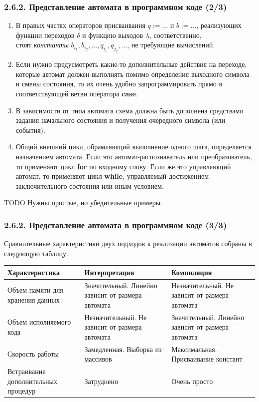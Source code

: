 \documentclass[mathserif,12pt,aspectratio=169]{beamer}
\def\emразделенной{\em разделенной}
\def\em#1{\it\color{blue}#1}
\def\Assign{\operatorname{:=}}
\def\TODO#1{{\color{gray} TODO {#1}}}
\begin{document}
\begin{frame}
\frametitle{2.6.2. Представление автомата в программном коде (2/3)}

\begin{remark} 
\begin{enumerate}
\item В правых частях операторов присваивания $q\Assign\dots$ и
$b\Assign\dots$, реализующих функции переходов $\delta$ и функцию
выходов $\lambda$, соответственно, \\стоят 
{\em константы} $b_{i_1},
b_{i_2},\dots, q_{i_1}, q_{j_2}, \dots$, не требующие вычислений.
\item Если нужно предусмотреть какие-то дополнительные действия
на переходе, которые автомат должен выполнять помимо определения
выходного символа и смены состояния, то их очень удобно
запрограммировать прямо в соответствующей ветви оператора
\textbf{case}.
\item В зависимости от типа автомата схема 
должна быть дополнена средствами задания начального состояния и получения очередного символа (или события).
\item Общий внешний цикл, обрамляющий выполнение одного шага, определяется назначением автомата.
Если это автомат-распознаватель или преобразователь,
то применяют цикл \textbf{for} по входному слову.
Если же это управляющий автомат, то применяют цикл
\textbf{while}, управляемый достижением заключительного состояния или иным условием. 
\end{enumerate}
\end{remark}

\TODO{Нужны простые, но убедительные примеры.}
\end{frame}


\begin{frame}
\frametitle{2.6.2. Представление автомата в программном коде (3/3)}

Сравнительные характеристики двух подходов к реализации автоматов
собраны в следующую таблицу.

\begin{tabular}{p{4cm}|p{5cm}|p{5cm}}
  \hline
  Характеристика & Интерпретация & Компиляция \\
  \hline
  Объем памяти для хранения данных &
  Значительный. Линейно зависит от размера автомата & Незначительный.
  Не зависит от размера автомата \\
    \hline
Объем исполняемого кода & Незначительный.
  Не зависит от размера автомата & Значительный. Линейно зависит от размера автомата \\
    \hline
Скорость работы & Замедленная. Выборка из массивов & Максимальная. Присваивание констант \\
  \hline
  Встраивание дополнительных процедур & Затруднено & Очень просто \\ \hline
\end{tabular}

\end{frame}
\end{document}
